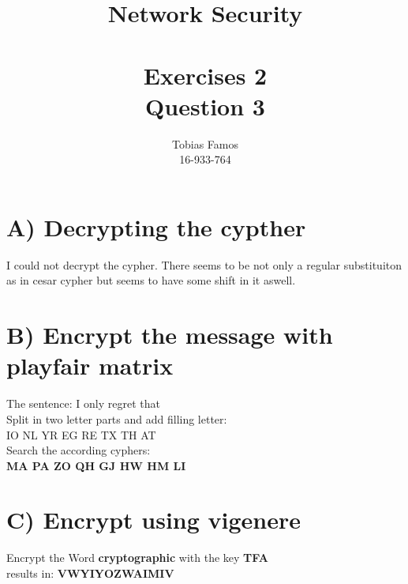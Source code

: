 \documentclass[11pt,a4paper]{article}
\title{Network Security \\ ~\\ \Large{Exercises 2 \\Question 3}}
\author{Tobias Famos\\ 16-933-764}
\begin{document}
    \maketitle
    \section*{A) Decrypting the cypther}
    I could not decrypt the cypher.
    There seems to be not only a regular substituiton as in cesar cypher but seems to have some shift in it aswell.

    \section*{B) Encrypt the message with playfair matrix}
    The sentence: I only regret that\\
    Split in two letter parts and add filling letter:\\
    IO NL YR EG RE TX TH AT\\
    Search the according cyphers:\\
    \textbf{MA PA ZO QH GJ HW HM LI}

    \section*{C) Encrypt using vigenere}
    Encrypt the Word \textbf{cryptographic} with the key \textbf{TFA}\\
    results in: \textbf{VWYIYOZWAIMIV}
\end{document}

